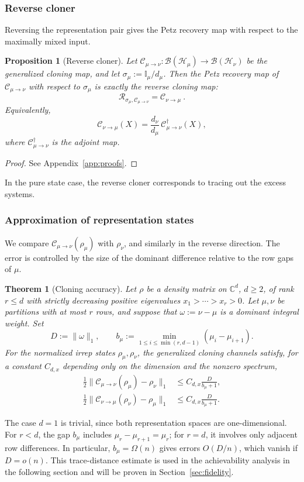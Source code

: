 \documentclass[a4paper,onecolumn,11pt]{quantumarticle}
\newtheorem{thm}{Theorem}
\newtheorem{prop}{Proposition}
\def\id{\mathbb{I}}
\def\C{\mathcal{C}}
\begin{document}
\subsubsection{Reverse cloner}
Reversing the representation pair gives the Petz recovery map with
respect to the maximally mixed input.
\begin{prop}[Reverse cloner]\label{prop:reverse}
Let $\C_{\mu\to\nu}:\mathcal B(\mathcal H_\mu)\to \mathcal B(\mathcal H_\nu)$
be the generalized cloning map, and let $\sigma_\mu := \id_\mu/d_\mu$.
Then the Petz recovery map of \(\C_{\mu\to\nu}\) with respect to \(\sigma_\mu\) is exactly the reverse  cloning map:
\[
\mathcal R_{\sigma_\mu,\C_{\mu\to\nu}}=\C_{\nu\to\mu}\ .
\]
Equivalently,
\[
\C_{\nu\to\mu}(X)=\frac{d_\nu}{d_\mu}\,\C_{\mu\to\nu}^{\dagger}(X),
\]
where \(\C_{\mu\to\nu}^{\dagger}\) is the adjoint map.
\end{prop}
\begin{proof}
See Appendix~\ref{app:proofs}.
\end{proof}
In the pure state case, the reverse cloner corresponds to tracing out the excess systems.

\subsubsection{Approximation of representation states}
We compare $\C_{\mu\to\nu}(\rho_\mu)$ with $\rho_\nu$, and similarly
in the reverse direction. The error is controlled by the size of the
dominant difference relative to the row gaps of $\mu$.
\begin{thm}[Cloning accuracy]\label{thm:main}
Let $\rho$ be a density matrix on $\mathbb C^d$, $d\ge2$, of rank $r\le d$ with
strictly decreasing positive eigenvalues $x_1>\cdots>x_r>0$.
Let $\mu,\nu$ be partitions with at most $r$ rows, and suppose
that $\omega:=\nu-\mu$ is a dominant integral weight. Set
\[
D:=\|\omega\|_1,\qquad
b_\mu:=\min_{1\le i\le\min(r,d-1)}(\mu_i-\mu_{i+1}).
\]
For the normalized irrep states $\rho_\mu,\rho_\nu$, the generalized
cloning channels satisfy, for a constant $C_{d,x}$ depending only on
the dimension and the nonzero spectrum,
\begin{align}\label{eq:cloning_trace_bound}
\frac12\|\C_{\mu\to\nu}(\rho_\mu)-\rho_\nu\|_1
&\le C_{d,x}\frac{D}{b_\mu+1},\nonumber\\
\frac12\|\C_{\nu\to\mu}(\rho_\nu)-\rho_\mu\|_1
&\le C_{d,x}\frac{D}{b_\mu+1}.
\end{align}
\end{thm}
The case $d=1$ is trivial, since both representation spaces are
one-dimensional. For $r<d$, the gap $b_\mu$ includes
$\mu_r-\mu_{r+1}=\mu_r$; for $r=d$, it involves only adjacent row differences.
In particular, $b_\mu=\Omega(n)$ gives errors $O(D/n)$, which vanish if $D=o(n)$. 
This trace-distance estimate is used in the achievability analysis in the following
section and will be proven in Section~\ref{sec:fidelity}.
\end{document}
